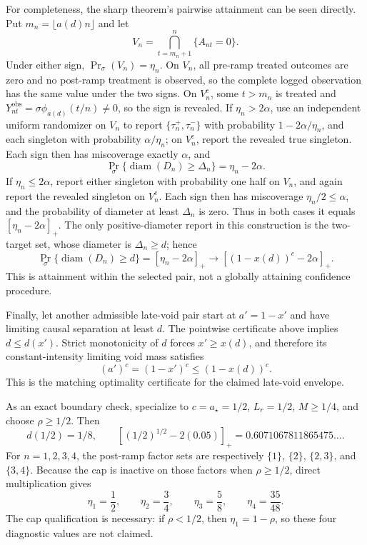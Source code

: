 For completeness, the sharp theorem's pairwise attainment can be seen directly. Put \(m_n=\lfloor a(d)n\rfloor\) and let
\[
 V_n=\bigcap_{t=m_n+1}^n\{A_{nt}=0\}.
\]
Under either sign, \(\Pr_\sigma(V_n)=\eta_n\). On \(V_n\), all pre-ramp treated outcomes are zero and no post-ramp treatment is observed, so the complete logged observation has the same value under the two signs. On \(V_n^c\), some \(t>m_n\) is treated and \(Y_{nt}^{\mathrm{obs}}=\sigma\phi_{a(d)}(t/n)\ne0\), so the sign is revealed. If \(\eta_n>2\alpha\), use an independent uniform randomizer on \(V_n\) to report \(\{\tau_n^+,\tau_n^-\}\) with probability \(1-2\alpha/\eta_n\), and each singleton with probability \(\alpha/\eta_n\); on \(V_n^c\), report the revealed true singleton. Each sign then has miscoverage exactly \(\alpha\), and
\[
 \Pr_\sigma\{\operatorname{diam}(D_n)\ge\Delta_n\}
 =\eta_n-2\alpha.
\]
If \(\eta_n\le2\alpha\), report either singleton with probability one half on \(V_n\), and again report the revealed singleton on \(V_n^c\). Each sign then has miscoverage \(\eta_n/2\le\alpha\), and the probability of diameter at least \(\Delta_n\) is zero. Thus in both cases it equals \([\eta_n-2\alpha]_+\). The only positive-diameter report in this construction is the two-target set, whose diameter is \(\Delta_n\ge d\); hence
\[
 \Pr_\sigma\{\operatorname{diam}(D_n)\ge d\}
 =[\eta_n-2\alpha]_+
 \longrightarrow[(1-x(d))^c-2\alpha]_+.
\]
This is attainment within the selected pair, not a globally attaining confidence procedure.

Finally, let another admissible late-void pair start at \(a'=1-x'\) and have limiting causal separation at least \(d\). The pointwise certificate above implies \(d\le d(x')\). Strict monotonicity of \(d\) forces \(x'\ge x(d)\), and therefore its constant-intensity limiting void mass satisfies
\[
 (a')^c=(1-x')^c\le(1-x(d))^c.
\]
This is the matching optimality certificate for the claimed late-void envelope.

As an exact boundary check, specialize to \(c=a_\star=1/2\), \(L_r=1/2\), \(M\ge1/4\), and choose \(\rho\ge1/2\). Then
\[
 d(1/2)=1/8,
 \qquad
 [(1/2)^{1/2}-2(0.05)]_+
 =0.6071067811865475\ldots.
\]
For \(n=1,2,3,4\), the post-ramp factor sets are respectively \(\{1\}\), \(\{2\}\), \(\{2,3\}\), and \(\{3,4\}\). Because the cap is inactive on those factors when \(\rho\ge1/2\), direct multiplication gives
\[
 \eta_1=\frac12,
 \qquad
 \eta_2=\frac34,
 \qquad
 \eta_3=\frac58,
 \qquad
 \eta_4=\frac{35}{48}.
\]
The cap qualification is necessary: if \(\rho<1/2\), then \(\eta_1=1-\rho\), so these four diagnostic values are not claimed.
